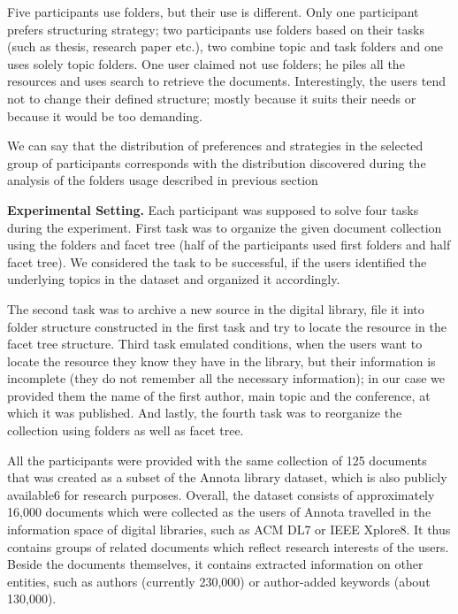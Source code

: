 \documentclass{article}
\begin{document}
 Five participants use folders, but their use is different. Only one participant prefers structuring strategy; two participants use folders based on their tasks (such as thesis, research paper etc.), two combine topic and task folders and one uses solely topic folders. One user claimed not use folders; he piles all the resources and uses search to retrieve the documents. Interestingly, the users tend not to change their defined structure; mostly because it suits their needs or because it would be too demanding.
 
 We can say that the distribution of preferences and strategies in the selected group of participants corresponds with the distribution discovered during the analysis of the folders usage described in previous section
 
 
\textbf{Experimental Setting.}
  Each participant was supposed to solve four tasks during the experiment. First task was to organize the given document collection using the folders  and facet tree (half of the participants used first folders and half facet tree). We considered the task to be successful, if the users identified the underlying topics in the dataset and organized it accordingly. 
  
   The second task was to archive a new source in the digital library, file it into folder structure constructed in the first task and try to locate the resource in the facet tree structure. Third task emulated conditions, when the users want to locate the resource they know they have in the library, but their information is incomplete (they do not remember all the necessary information); in our case we provided them the name of the first author, main topic and the conference, at which it was published. And lastly, the fourth task was to reorganize the collection using folders as well as facet tree.
   
    All the participants were provided with the same collection of 125 documents that was created as a subset of the Annota library dataset, which is also publicly available6 for research purposes. Overall, the dataset consists of approximately 16,000 documents which were collected as the users of Annota travelled in the information space of digital libraries, such as ACM DL7 or IEEE Xplore8. It thus contains groups of related documents which reflect research interests of the users. Beside the documents themselves, it contains extracted information on other entities, such as authors (currently 230,000) or author-added keywords (about 130,000). 
    
\end{document}
